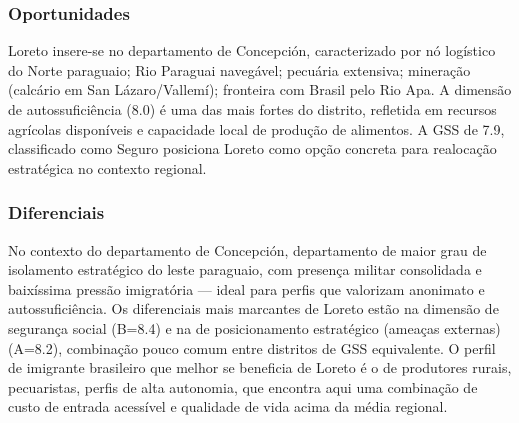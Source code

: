 \subsubsection*{Oportunidades}\label{oport-loreto-0104}
Loreto insere-se no departamento de Concepción, caracterizado por nó logístico do Norte paraguaio; Rio Paraguai navegável; pecuária extensiva; mineração (calcário em San Lázaro/Vallemí); fronteira com Brasil pelo Rio Apa. A dimensão de autossuficiência (8.0) é uma das mais fortes do distrito, refletida em recursos agrícolas disponíveis e capacidade local de produção de alimentos. A GSS de 7.9, classificado como Seguro posiciona Loreto como opção concreta para realocação estratégica no contexto regional.

\subsubsection*{Diferenciais}\label{dif-loreto-0104}
No contexto do departamento de Concepción, departamento de maior grau de isolamento estratégico do leste paraguaio, com presença militar consolidada e baixíssima pressão imigratória — ideal para perfis que valorizam anonimato e autossuficiência. Os diferenciais mais marcantes de Loreto estão na dimensão de segurança social (B=8.4) e na de posicionamento estratégico (ameaças externas) (A=8.2), combinação pouco comum entre distritos de GSS equivalente. O perfil de imigrante brasileiro que melhor se beneficia de Loreto é o de produtores rurais, pecuaristas, perfis de alta autonomia, que encontra aqui uma combinação de custo de entrada acessível e qualidade de vida acima da média regional.
